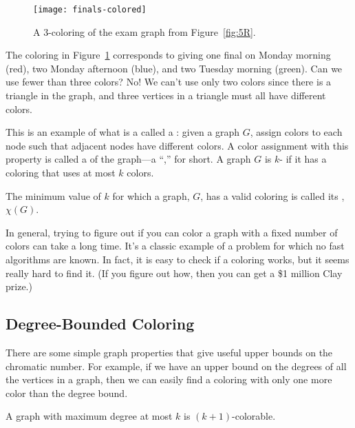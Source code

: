\begin{figure}

\texttt{[image: finals-colored]}

\caption{A 3-coloring of the exam graph from Figure~\ref{fig:5R}.}

\label{fig:5S}

\end{figure}

The coloring in Figure~\ref{fig:5S} corresponds to giving one final on
Monday morning (red), two Monday afternoon (blue), and two Tuesday
morning (green).  Can we use fewer than three colors?  No! We can't
use only two colors since there is a triangle in the graph, and three
vertices in a triangle must all have different colors.

This is an example of what is a called a :
given a graph $G$, assign colors to each node such that adjacent nodes
have different colors.  A color assignment with this property is called a
 of the graph---a ``,'' for short.  A
graph $G$ is $k$- if it has a coloring that uses at most
$k$ colors.
\begin{definition}
  The minimum value of $k$ for which a graph, $G$, has a valid coloring is
  called its , $\chi(G)$.
\end{definition}

In general, trying to figure out if you can color a graph with a fixed
number of colors can take a long time.  It's a classic example of a
problem for which no fast algorithms are known.  In fact, it is easy to
check if a coloring works, but it seems really hard to find it. (If you
figure out how, then you can get a \$1 million Clay prize.)


\subsection{Degree-Bounded Coloring}

There are some simple graph properties that give useful upper bounds
on the chromatic number.  For example, if we have an upper bound on
the degrees of all the vertices in a graph, then we can easily find a
coloring with only one more color than the degree bound.

\begin{theorem}\label{k+1-colorable}
A graph with maximum degree at most $k$ is $(k+1)$-colorable.
\end{theorem}

